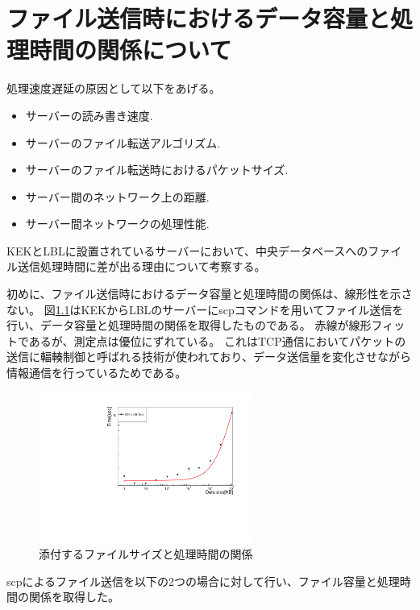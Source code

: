 \chapter{ファイル送信時におけるデータ容量と処理時間の関係について} \label{chap:data_time_detail}

処理速度遅延の原因として以下をあげる。
\begin{itemize}
  \item サーバーの読み書き速度.
  \item サーバーのファイル転送アルゴリズム.
  \item サーバーのファイル転送時におけるパケットサイズ.
  \item サーバー間のネットワーク上の距離.
  \item サーバー間ネットワークの処理性能.
\end{itemize}

KEKとLBLに設置されているサーバーにおいて、中央データベースへのファイル送信処理時間に差が出る理由について考察する。

初めに、ファイル送信時におけるデータ容量と処理時間の関係は、線形性を示さない。
図\ref{datasize_vs_time_scp}はKEKからLBLのサーバーにscpコマンドを用いてファイル送信を行い、データ容量と処理時間の関係を取得したものである。
赤線が線形フィットであるが、測定点は優位にずれている。
これはTCP通信においてパケットの送信に輻輳制御\cite{e-1}と呼ばれる技術が使われており、データ送信量を変化させながら情報通信を行っているためである。

\begin{figure}[bpt]\centering
  \begin{center}
    \includegraphics[width=7cm,angle=270]{./datasize_vs_time_scp.pdf}
  \caption[添付するファイルサイズと処理時間の関係]{添付するファイルサイズと処理時間の関係}
  \label{datasize_vs_time_scp}
  \end{center}
\end{figure}

scpによるファイル送信を以下の2つの場合に対して行い、ファイル容量と処理時間の関係を取得した。

